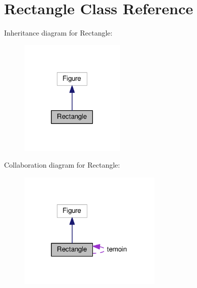 \hypertarget{class_rectangle}{}\section{Rectangle Class Reference}
\label{class_rectangle}


Inheritance diagram for Rectangle\+:
\nopagebreak
\begin{figure}[H]
\begin{center}
\leavevmode
\includegraphics[width=141pt]{class_rectangle__inherit__graph}
\end{center}
\end{figure}


Collaboration diagram for Rectangle\+:
\nopagebreak
\begin{figure}[H]
\begin{center}
\leavevmode
\includegraphics[width=192pt]{class_rectangle__coll__graph}
\end{center}
\end{figure}

